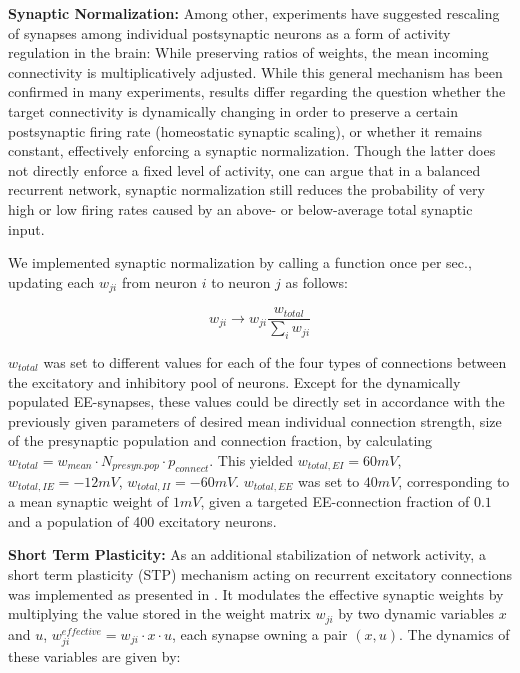 \documentclass[10pt,a4paper]{article}
\begin{document}
\textbf{Synaptic Normalization:} Among other, experiments have suggested rescaling of synapses among individual postsynaptic neurons as a form of activity regulation in the brain: While preserving ratios of weights, the mean incoming connectivity is multiplicatively adjusted. While this general mechanism has been confirmed in many experiments, results differ regarding the question whether the target connectivity is dynamically changing in order to preserve a certain postsynaptic firing rate (homeostatic synaptic scaling), or whether it remains constant, effectively enforcing a synaptic normalization. Though the latter does not directly enforce a fixed level of activity, one can argue that in a balanced recurrent network, synaptic normalization still reduces the probability of very high or low firing rates caused by an above- or below-average total synaptic input.

We implemented synaptic normalization by calling a function once per sec., updating each $w_{ji}$ from neuron $i$ to neuron $j$ as follows:

\begin{equation}
w_{ji} \rightarrow w_{ji} \frac{w_{total}}{\sum_i w_{ji}}
\label{Synnnorm}
\end{equation}

$w_{total}$ was set to different values for each of the four types of connections between the excitatory and inhibitory pool of neurons. Except for the dynamically populated EE-synapses, these values could be directly set in accordance with the previously given parameters of desired mean individual connection strength, size of the presynaptic population and connection fraction, by calculating $w_{total} = w_{mean} \cdot N_{presyn. pop}\cdot p_{connect}$. This yielded $w_{total,EI} = 60 mV$, $w_{total,IE} = -12 mV$, $w_{total,II} = -60 mV$. $w_{total,EE}$ was set to $40mV$,  corresponding to a mean synaptic weight of $1mV$, given a targeted EE-connection fraction of $0.1$ and a population of 400 excitatory neurons.

\textbf{Short Term Plasticity:} As an additional stabilization of network activity, a short term plasticity (STP) mechanism acting on recurrent excitatory connections was implemented as presented in \cite{Markram_STP}. It modulates the effective synaptic weights by multiplying the value stored in the weight matrix $w_{ji}$ by two dynamic variables $x$ and $u$, $w^{effective}_{ji} = w_{ji}\cdot x \cdot u$, each synapse owning a pair $(x,u)$. The dynamics of these variables are given by:
\end{document}
